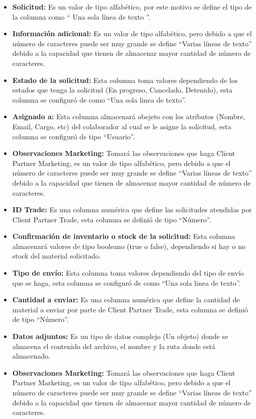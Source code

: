 \begin{itemize}
	\item \textbf{Solicitud: } Es un valor de tipo alfabético, por este motivo se define el tipo de la columna como `` Una sola línea de texto ''.
	\item \textbf{Información adicional: } Es un valor de tipo alfabético, pero debido a que el número de caracteres puede ser muy grande se define ``Varias líneas de texto'' debido a la capacidad que tienen de almacenar mayor cantidad de número de caracteres.
	\item \textbf{Estado de la solicitud: } Esta columna toma valores dependiendo de los estados que tenga la solicitud (En progreso, Cancelado, Detenido), esta columna se configuró de como ``Una sola linea de texto''.
	\item \textbf{Asignado a: } Esta columna almacenará obejeto con los atributos (Nombre, Email, Cargo, etc) del colaborador al cual se le asigne la solicitud, esta columna se configuró de tipo ``Usuario''.
	\item \textbf{Observaciones Marketing: } Tomará las observaciones que haga Client Partner Marketing, es un valor de tipo alfabético, pero debido a que el número de caracteres puede ser muy grande se define ``Varias líneas de texto'' debido a la capacidad que tienen de almacenar mayor cantidad de número de caracteres.
	\item \textbf{ID Trade: }Es una columna numérica que define las solicitudes atendidas por Client Partner Trade, esta columna se definió de tipo ``Número''.
	\item \textbf{Confirmación de inventario o stock de la solicitud: }Esta columna almacenará valores de tipo booleano (true o false), dependiendo si hay o no stock del material solicitado.
	\item \textbf{Tipo de envío: } Esta columna toma valores dependiendo del tipo de envío que se haga, esta columna se configuró de como ``Una sola linea de texto''.
	\item \textbf{Cantidad a enviar: }Es una columna numérica que define la cantidad de material a enviar por parte de Client Partner Trade, esta columna se definió de tipo ``Número''.
	\item \textbf{Datos adjuntos: } Es un tipo de datos complejo (Un objeto) donde se almacena el contenido del archivo, el nombre y la ruta donde está almacenado.
	\item \textbf{Observaciones Marketing: } Tomará las observaciones que haga Client Partner Marketing, es un valor de tipo alfabético, pero debido a que el número de caracteres puede ser muy grande se define ``Varias líneas de texto'' debido a la capacidad que tienen de almacenar mayor cantidad de número de caracteres.

\end{itemize}
